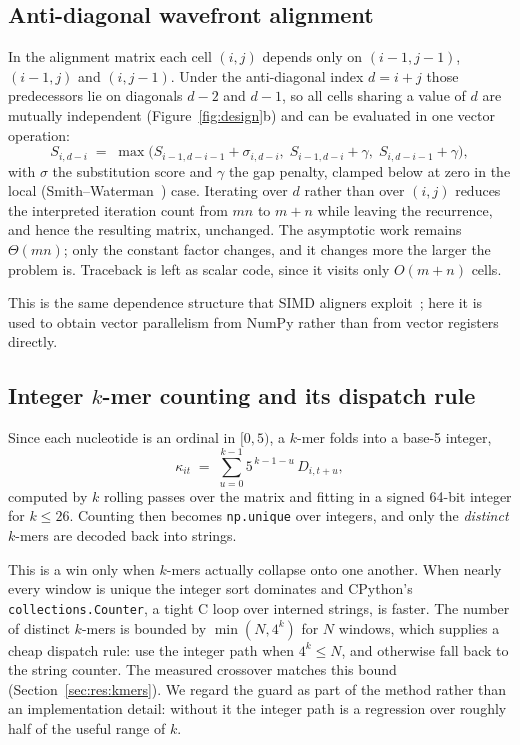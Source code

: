 \documentclass[10pt,letterpaper]{article}
\begin{document}
\subsection{Anti-diagonal wavefront alignment}
\label{sec:wavefront}

In the alignment matrix each cell $(i,j)$ depends only on $(i-1,j-1)$, $(i-1,j)$
and $(i,j-1)$. Under the anti-diagonal index $d = i+j$ those predecessors lie on
diagonals $d-2$ and $d-1$, so all cells sharing a value of $d$ are mutually
independent (Figure~\ref{fig:design}b) and can be evaluated in one vector
operation:
\begin{equation}
S_{i,d-i} \;=\; \max\!\Big(
  S_{i-1,d-i-1} + \sigma_{i,d-i},\;
  S_{i-1,d-i} + \gamma,\;
  S_{i,d-i-1} + \gamma
\Big),
\end{equation}
with $\sigma$ the substitution score and $\gamma$ the gap penalty, clamped below
at zero in the local (Smith--Waterman~\cite{smith1981}) case. Iterating over $d$
rather than over $(i,j)$ reduces the interpreted iteration count from $mn$ to
$m+n$ while leaving the recurrence, and hence the resulting matrix, unchanged.
The asymptotic work remains $\Theta(mn)$; only the constant factor changes, and
it changes more the larger the problem is. Traceback is left as scalar code,
since it visits only $O(m+n)$ cells.

This is the same dependence structure that SIMD aligners
exploit~\cite{wozniak1997,rognes2011}; here it is used to obtain vector
parallelism from NumPy rather than from vector registers directly.

\subsection{Integer $k$-mer counting and its dispatch rule}
\label{sec:kmers}

Since each nucleotide is an ordinal in $[0,5)$, a $k$-mer folds into a base-5
integer,
\begin{equation}
\kappa_{it} \;=\; \sum_{u=0}^{k-1} 5^{\,k-1-u}\, D_{i,t+u},
\end{equation}
computed by $k$ rolling passes over the matrix and fitting in a signed 64-bit
integer for $k \le 26$. Counting then becomes \texttt{np.unique} over integers,
and only the \emph{distinct} $k$-mers are decoded back into strings.

This is a win only when $k$-mers actually collapse onto one another. When nearly
every window is unique the integer sort dominates and CPython's
\texttt{collections.Counter}, a tight C loop over interned strings, is
faster. The number of distinct $k$-mers is bounded by $\min(N,4^k)$ for $N$
windows, which supplies a cheap dispatch rule: use the integer path when
$4^k \le N$, and otherwise fall back to the string counter. The measured
crossover matches this bound (Section~\ref{sec:res:kmers}). We regard the guard
as part of the method rather than an implementation detail: without it the
integer path is a regression over roughly half of the useful range of $k$.
\end{document}
